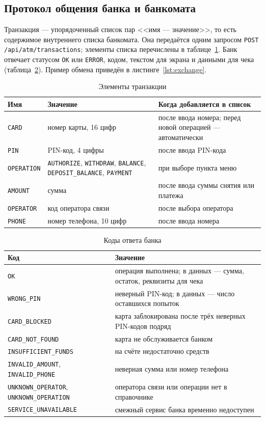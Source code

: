 \documentclass[14pt,a4paper]{extarticle}
\begin{document}
\subsection{Протокол общения банка и банкомата}

Транзакция --- упорядоченный список пар <<имя --- значение>>, то есть содержимое
внутреннего списка банкомата. Она передаётся одним запросом
\texttt{POST /api/atm/transactions}; элементы списка перечислены в
таблице~\ref{tab:items}. Банк отвечает статусом \texttt{OK} или \texttt{ERROR}, кодом, текстом
для экрана и данными для чека (таблица~\ref{tab:codes}). Пример обмена приведён в
листинге~\ref{lst:exchange}.

\begin{table}[H]
\caption{Элементы транзакции}
\label{tab:items}
\centering
\small
\begin{tabularx}{\textwidth}{llX}
\toprule
Имя & Значение & Когда добавляется в список \\
\midrule
\texttt{CARD} & номер карты, 16 цифр & после ввода номера; перед новой операцией --- автоматически \\
\texttt{PIN} & PIN-код, 4 цифры & после ввода PIN-кода \\
\texttt{OPERATION} & \texttt{AUTHORIZE}, \texttt{WITHDRAW}, \texttt{BALANCE}, \texttt{DEPOSIT\_BALANCE}, \texttt{PAYMENT} & при выборе пункта меню \\
\texttt{AMOUNT} & сумма & после ввода суммы снятия или платежа \\
\texttt{OPERATOR} & код оператора связи & после выбора оператора \\
\texttt{PHONE} & номер телефона, 10 цифр & после ввода номера \\
\bottomrule
\end{tabularx}
\end{table}

\begin{table}[H]
\caption{Коды ответа банка}
\label{tab:codes}
\centering
\small
\begin{tabularx}{\textwidth}{lX}
\toprule
Код & Значение \\
\midrule
\texttt{OK} & операция выполнена; в данных --- сумма, остаток, реквизиты для чека \\
\texttt{WRONG\_PIN} & неверный PIN-код; в данных --- число оставшихся попыток \\
\texttt{CARD\_BLOCKED} & карта заблокирована после трёх неверных PIN-кодов подряд \\
\texttt{CARD\_NOT\_FOUND} & карта не обслуживается банком \\
\texttt{INSUFFICIENT\_FUNDS} & на счёте недостаточно средств \\
\texttt{INVALID\_AMOUNT}, \texttt{INVALID\_PHONE} & неверная сумма или номер телефона \\
\texttt{UNKNOWN\_OPERATOR}, \texttt{UNKNOWN\_OPERATION} & оператора связи или операции нет в справочнике \\
\texttt{SERVICE\_UNAVAILABLE} & смежный сервис банка временно недоступен \\
\bottomrule
\end{tabularx}
\end{table}
\end{document}
